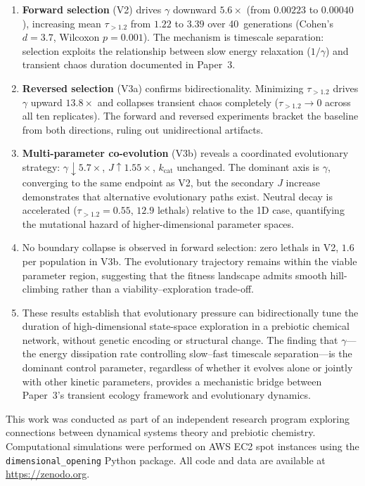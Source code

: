 \documentclass[twocolumn,showpacs,preprintnumbers,amsmath,amssymb,prd,floatfix]{revtex4-2}
\newcommand{\tauexp}{\tau_{>1.2}}
\newcommand{\kcat}{k_{\mathrm{cat}}}
\begin{document}
\begin{enumerate}
\item \textbf{Forward selection} (V2) drives $\gamma$ downward $5.6\times$ (from $0.00223$ to $0.00040$), increasing mean $\tauexp$ from $1.22$ to $3.39$ over 40~generations (Cohen's $d = 3.7$, Wilcoxon $p = 0.001$). The mechanism is timescale separation: selection exploits the relationship between slow energy relaxation ($1/\gamma$) and transient chaos duration documented in Paper~3.

\item \textbf{Reversed selection} (V3a) confirms bidirectionality. Minimizing $\tauexp$ drives $\gamma$ upward $13.8\times$ and collapses transient chaos completely ($\tauexp \to 0$ across all ten replicates). The forward and reversed experiments bracket the baseline from both directions, ruling out unidirectional artifacts.

\item \textbf{Multi-parameter co-evolution} (V3b) reveals a coordinated evolutionary strategy: $\gamma \downarrow 5.7\times$, $J \uparrow 1.55\times$, $\kcat$ unchanged. The dominant axis is $\gamma$, converging to the same endpoint as V2, but the secondary $J$ increase demonstrates that alternative evolutionary paths exist. Neutral decay is accelerated ($\tauexp = 0.55$, $12.9$ lethals) relative to the 1D case, quantifying the mutational hazard of higher-dimensional parameter spaces.

\item No boundary collapse is observed in forward selection: zero lethals in V2, $1.6$ per population in V3b. The evolutionary trajectory remains within the viable parameter region, suggesting that the fitness landscape admits smooth hill-climbing rather than a viability--exploration trade-off.

\item These results establish that evolutionary pressure can bidirectionally tune the duration of high-dimensional state-space exploration in a prebiotic chemical network, without genetic encoding or structural change. The finding that $\gamma$---the energy dissipation rate controlling slow--fast timescale separation---is the dominant control parameter, regardless of whether it evolves alone or jointly with other kinetic parameters, provides a mechanistic bridge between Paper~3's transient ecology framework and evolutionary dynamics.
\end{enumerate}

\begin{acknowledgments}
This work was conducted as part of an independent research program exploring connections between dynamical systems theory and prebiotic chemistry. Computational simulations were performed on AWS EC2 spot instances using the \texttt{dimensional\_opening} Python package. All code and data are available at \url{https://zenodo.org}.
\end{acknowledgments}
\end{document}
